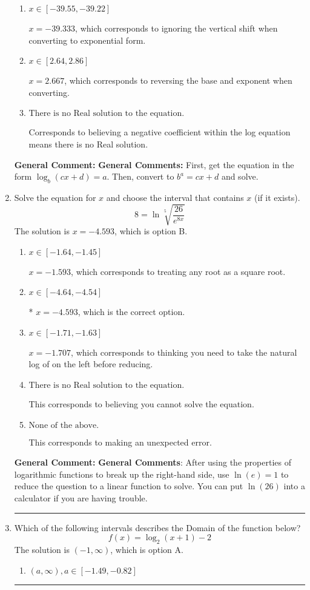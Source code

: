 \documentclass{extbook}[14pt]
\newcommand{\litem}[1]{\item #1

\rule{\textwidth}{0.4pt}}
\begin{document}
\begin{enumerate}
{\begin{enumerate}[label=\Alph*.]
* $x = 2.267$, which is the correct option.
\item \( x \in [-39.55, -39.22] \)

$x = -39.333$, which corresponds to ignoring the vertical shift when converting to exponential form.
\item \( x \in [2.64, 2.86] \)

$x = 2.667$, which corresponds to reversing the base and exponent when converting.
\item \( \text{There is no Real solution to the equation.} \)

Corresponds to believing a negative coefficient within the log equation means there is no Real solution.
\end{enumerate}

\textbf{General Comment:} \textbf{General Comments:} First, get the equation in the form $\log_b{(cx+d)} = a$. Then, convert to $b^a = cx+d$ and solve.
}
\litem{
 Solve the equation for $x$ and choose the interval that contains $x$ (if it exists).
\[  8 = \ln{\sqrt[5]{\frac{26}{e^{8x}}}} \]The solution is \( x = -4.593 \), which is option B.\begin{enumerate}[label=\Alph*.]
\item \( x \in [-1.64, -1.45] \)

$x = -1.593$, which corresponds to treating any root as a square root.
\item \( x \in [-4.64, -4.54] \)

* $x = -4.593$, which is the correct option.
\item \( x \in [-1.71, -1.63] \)

$x = -1.707$, which corresponds to thinking you need to take the natural log of on the left before reducing.
\item \( \text{There is no Real solution to the equation.} \)

This corresponds to believing you cannot solve the equation.
\item \( \text{None of the above.} \)

This corresponds to making an unexpected error.
\end{enumerate}

\textbf{General Comment:} \textbf{General Comments}: After using the properties of logarithmic functions to break up the right-hand side, use $\ln(e) = 1$ to reduce the question to a linear function to solve. You can put $\ln(26)$ into a calculator if you are having trouble.
}
\litem{
Which of the following intervals describes the Domain of the function below?
\[ f(x) = \log_2{(x+1)}-2 \]The solution is \( (-1, \infty) \), which is option A.\begin{enumerate}[label=\Alph*.]
\item \( (a, \infty), a \in [-1.49, -0.82] \)


\end{enumerate}}
\end{enumerate}
\end{document}
